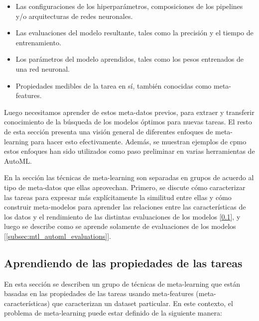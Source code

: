 \begin{itemize}
	\item Las configuraciones de los hiperparámetros, composiciones de los pipelines y/o arquitecturas de redes neuronales.
	\item Las evaluaciones del modelo resultante, tales como la precisión y el tiempo de entrenamiento.
	\item Los parámetros del modelo aprendidos, tales como los pesos entrenados de una red neuronal.
	\item Propiedades medibles de la tarea en sí, también conocidas como meta-features.
\end{itemize}

Luego necesitamos aprender de estos meta-datos previos, para extraer y transferir conocimiento de la búsqueda de los modelos óptimos para nuevas tareas. El resto de esta sección presenta una visión general de diferentes enfoques de meta-learning para hacer esto efectivamente. Además, se muestran ejemplos de cpmo estos enfoques han sido utilizados como paso preliminar en varias herramientas de AutoML.

En la sección las técnicas de meta-learning son separadas en grupos de acuerdo al tipo de meta-datos que ellas aprovechan. Primero, se discute cómo caracterizar las tareas para expresar más explícitamente la similitud entre ellas y cómo construir meta-modelos para aprender las relaciones entre las características de los datos y el rendimiento de las distintas evaluaciones de los modelos [\ref{subsec:mtl_automl_proprerties}], y luego se describe como se aprende solamente de evaluaciones de los modelos [\ref{subsec:mtl_automl_evaluations}].

\subsection{Aprendiendo de las propiedades de las tareas}\label{subsec:mtl_automl_proprerties}


En esta sección se describen un grupo de técnicas de meta-learning que están basadas en las propiedades de las tareas usando meta-features (meta-características) que caracterizan un dataset particular. En este contexto, el problema de meta-learning puede estar definido de la siguiente manera:

